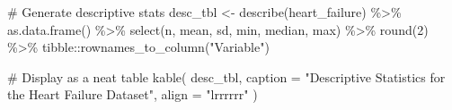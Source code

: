 \documentclass[
  letterpaper,
  DIV=11,
  numbers=noendperiod]{scrartcl}
\newenvironment{Shaded}{\begin{snugshade}}{\end{snugshade}}
\newcommand{\AttributeTok}[1]{\textcolor[rgb]{0.40,0.45,0.13}{#1}}
\newcommand{\CommentTok}[1]{\textcolor[rgb]{0.37,0.37,0.37}{#1}}
\newcommand{\DecValTok}[1]{\textcolor[rgb]{0.68,0.00,0.00}{#1}}
\newcommand{\FunctionTok}[1]{\textcolor[rgb]{0.28,0.35,0.67}{#1}}
\newcommand{\NormalTok}[1]{\textcolor[rgb]{0.00,0.23,0.31}{#1}}
\newcommand{\OtherTok}[1]{\textcolor[rgb]{0.00,0.23,0.31}{#1}}
\newcommand{\SpecialCharTok}[1]{\textcolor[rgb]{0.37,0.37,0.37}{#1}}
\newcommand{\StringTok}[1]{\textcolor[rgb]{0.13,0.47,0.30}{#1}}
\begin{document}
\begin{Shaded}
\begin{Highlighting}[]
\CommentTok{\# Generate descriptive stats}
\NormalTok{desc\_tbl }\OtherTok{\textless{}{-}} \FunctionTok{describe}\NormalTok{(heart\_failure) }\SpecialCharTok{\%\textgreater{}\%}
  \FunctionTok{as.data.frame}\NormalTok{() }\SpecialCharTok{\%\textgreater{}\%}
  \FunctionTok{select}\NormalTok{(n, mean, sd, min, median, max) }\SpecialCharTok{\%\textgreater{}\%}
  \FunctionTok{round}\NormalTok{(}\DecValTok{2}\NormalTok{) }\SpecialCharTok{\%\textgreater{}\%}
\NormalTok{  tibble}\SpecialCharTok{::}\FunctionTok{rownames\_to\_column}\NormalTok{(}\StringTok{"Variable"}\NormalTok{)}

\CommentTok{\# Display as a neat table}
\FunctionTok{kable}\NormalTok{(}
\NormalTok{  desc\_tbl,}
  \AttributeTok{caption =} \StringTok{"Descriptive Statistics for the Heart Failure Dataset"}\NormalTok{,}
  \AttributeTok{align =} \StringTok{"lrrrrrr"}
\NormalTok{)}
\end{Highlighting}
\end{Shaded}
\end{document}
